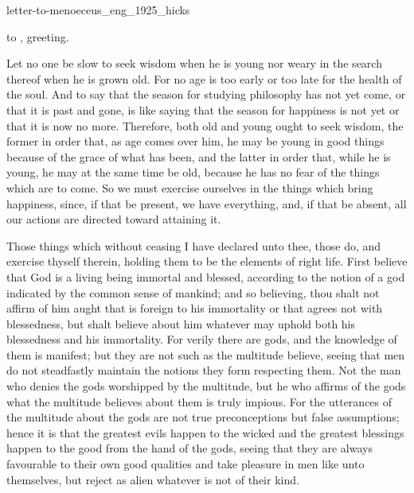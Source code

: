 \documentclass{stex}
\begin{document}
\begin{smodule}{letter-to-menoeceus_eng_1925_hicks}


\begin{sparagraph}[id=letter-to-menoeceus,name=Letter to Menoeceus]
  \noindent {} to , greeting.

  \vspace{1em}
  Let no one be slow to seek wisdom when he is young nor weary in the search thereof when he is grown old.
  For no age is too early or too late for the health of the soul.
  And to say that the season for studying philosophy has not yet come, or that it is past and gone, is like saying that the season for happiness is not yet or that it is now no more.
  Therefore, both old and young ought to seek wisdom, the former in order that, as age comes over him, he may be young in good things because of the grace of what has been, and the latter in order that, while he is young, he may at the same time be old, because he has no fear of the things which are to come.
  So we must exercise ourselves in the things which bring happiness, since, if that be present, we have everything, and, if that be absent, all our actions are directed toward attaining it.

  Those things which without ceasing I have declared unto thee, those do, and exercise thyself therein, holding them to be the elements of right life.
  First believe that God is a living being immortal and blessed, according to the notion of a god indicated by the common sense of mankind; and so believing, thou shalt not affirm of him aught that is foreign to his immortality or that agrees not with blessedness, but shalt believe about him whatever may uphold both his blessedness and his immortality.
  For verily there are gods, and the knowledge of them is manifest; but they are not such as the multitude believe, seeing that men do not steadfastly maintain the notions they form respecting them.
  Not the man who denies the gods worshipped by the multitude, but he who affirms of the gods what the multitude believes about them is truly impious.
  For the utterances of the multitude about the gods are not true preconceptions but false assumptions; hence it is that the greatest evils happen to the wicked and the greatest blessings happen to the good from the hand of the gods, seeing that they are always favourable to their own good qualities and take pleasure in men like unto themselves, but reject as alien whatever is not of their kind.


\end{sparagraph}
\end{smodule}
\end{document}
